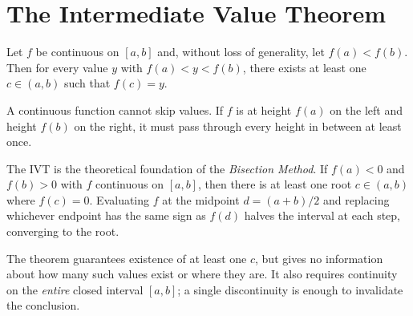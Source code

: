 \section*{The Intermediate Value Theorem}

\begin{tcolorbox}[colback=thmbox, colframe=thmborder, arc=2pt,
  left=6pt, right=6pt, top=4pt, bottom=4pt,
  title={\small\textbf{Theorem (Intermediate Value Theorem)}},
  fonttitle=\small\bfseries]
Let $f$ be continuous on $[a, b]$ and, without loss of generality,
let $f(a) < f(b)$.
Then for every value $y$ with $f(a) < y < f(b)$, there exists at
least one $c \in (a, b)$ such that $f(c) = y$.
\end{tcolorbox}

\begin{remark*}[Intuition]
A continuous function cannot skip values.
If $f$ is at height $f(a)$ on the left and height $f(b)$ on the right,
it must pass through every height in between at least once.
\end{remark*}

\begin{remark*}
The IVT is the theoretical foundation of the \emph{Bisection Method}.
If $f(a) < 0$ and $f(b) > 0$ with $f$ continuous on $[a, b]$, then
there is at least one root $c \in (a, b)$ where $f(c) = 0$.
Evaluating $f$ at the midpoint $d = (a + b)/2$ and replacing whichever
endpoint has the same sign as $f(d)$ halves the interval at each step,
converging to the root.
\end{remark*}

\begin{remark*}
The theorem guarantees existence of at least one $c$, but gives no
information about how many such values exist or where they are.
It also requires continuity on the \emph{entire} closed interval
$[a, b]$; a single discontinuity is enough to invalidate the
conclusion.
\end{remark*}